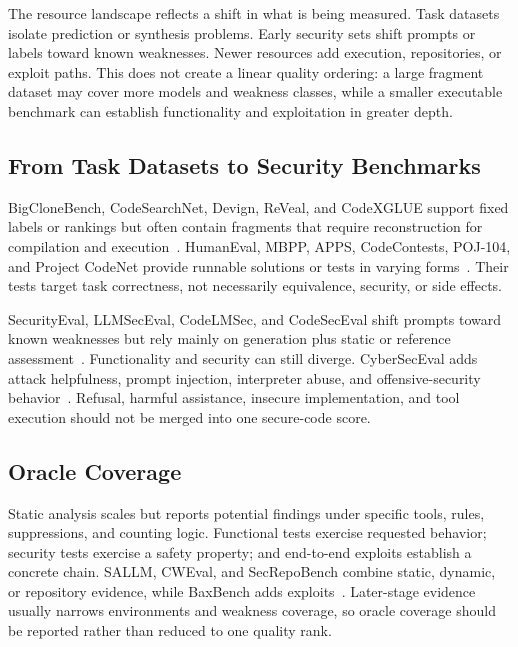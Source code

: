 \documentclass[acmsmall,screen,review]{acmart}
\begin{document}
The resource landscape reflects a shift in what is being measured. Task datasets isolate prediction or synthesis problems. Early security sets shift prompts or labels toward known weaknesses. Newer resources add execution, repositories, or exploit paths. This does not create a linear quality ordering: a large fragment dataset may cover more models and weakness classes, while a smaller executable benchmark can establish functionality and exploitation in greater depth.

\subsection{From Task Datasets to Security Benchmarks}
BigCloneBench, CodeSearchNet, Devign, ReVeal, and CodeXGLUE support fixed labels or rankings but often contain fragments that require reconstruction for compilation and execution~\cite{svajlenko2015bigclonebench,husain2019codesearchnet,zhou2019devign,chakraborty2021reveal,lu2021codexglue}. HumanEval, MBPP, APPS, CodeContests, POJ-104, and Project CodeNet provide runnable solutions or tests in varying forms~\cite{chen2021humaneval,austin2021mbpp,hendrycks2021apps,li2022codecontests,mou2016poj,puri2021codenet}. Their tests target task correctness, not necessarily equivalence, security, or side effects.

SecurityEval, LLMSecEval, CodeLMSec, and CodeSecEval shift prompts toward known weaknesses but rely mainly on generation plus static or reference assessment~\cite{siddiq2022securityeval,tony2023llmseval,hajipour2024codelmsec,codeseceval2024}. Functionality and security can still diverge. CyberSecEval adds attack helpfulness, prompt injection, interpreter abuse, and offensive-security behavior~\cite{bhatt2023cyberseceval,cyberseceval2,cyberseceval3}. Refusal, harmful assistance, insecure implementation, and tool execution should not be merged into one secure-code score.

\subsection{Oracle Coverage}
Static analysis scales but reports potential findings under specific tools, rules, suppressions, and counting logic. Functional tests exercise requested behavior; security tests exercise a safety property; and end-to-end exploits establish a concrete chain. SALLM, CWEval, and SecRepoBench combine static, dynamic, or repository evidence, while BaxBench adds exploits~\cite{siddiq2024sallm,cweval2025,secrepobench2025,baxbench2025}. Later-stage evidence usually narrows environments and weakness coverage, so oracle coverage should be reported rather than reduced to one quality rank.
\end{document}
